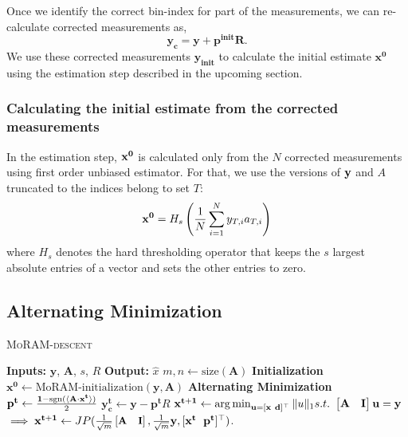 Once we identify the correct bin-index for part of the measurements, we can re-calculate corrected measurements as,
$$
\mathbf{y_{c} = y + p^{init}R}.
$$
We use these corrected measurements $\mathbf{y_{init}}$ to calculate the initial estimate $\mathbf{{x}^0}$ using the estimation step described in the upcoming section.
\subsubsection{Calculating the initial estimate from the corrected measurements}
In the estimation step, $\mathbf{x^0}$ is calculated only from the $N$ corrected measurements using first order unbiased estimator. For that, we use the versions of $\mathbf{y}$ and $A$ truncated to the indices belong to set $T$:
\begin{equation}
\mathbf{x^0} = H_s\left( \frac{1}{N}\sum_{i=1}^{N}y_{T,i}a_{T,i}\right)
\label{eq:init}
\end{equation}
where $H_s$ denotes the hard thresholding operator that keeps the $s$ largest absolute entries of a vector and sets the other entries to zero.
\subsection{Alternating Minimization}
\label{sec:altmin}
\begin{algorithm}[H]
	\caption{\textsc{MoRAM-descent}}
	\label{alg:MoRAM}
	\begin{algorithmic}
		\State\textbf{Inputs:} $\mathbf{y}$, $\mathbf{A}$, $s$, $R$
		\State\textbf{Output:}  $\widehat{x}$
		\State $m,n \leftarrow \mathrm{size}(\mathbf{A})$ 
		\State \textbf{Initialization}
		\State $\mathbf{x^0} \leftarrow \textrm{MoRAM-initialization}(\mathbf{y, A})$ 
		\State \textbf{Alternating Minimization}
		\State $\mathbf{{p}^{t}} \leftarrow \frac{\mathbf{1}-\mathrm{sgn}(\langle \mathbf{A} \cdot \mathbf{x^t} \rangle)}{2}$
		\State $\mathbf{y^t_c} \leftarrow \mathbf{y} - \mathbf{p^t}R$
		\State $\mathbf{{x}^{t+1}}\leftarrow \operatorname*{arg\,min}_{\mathbf{u}=[\mathbf{x~d}]^\top}\|u\|_1  s.t.~ \begin{bmatrix} \mathbf{A} & \mathbf{I} \end{bmatrix}\mathbf{u} = \mathbf{y}$ 
		\State $\implies \mathbf{{x}^{t+1}}\leftarrow \small{JP(\frac{1}{\sqrt{m}}\begin{bmatrix} \mathbf{A} & \mathbf{I} \end{bmatrix},\frac{1}{\sqrt{m}}\mathbf{y},[\mathbf{x^t~~p^t}]^\top)}$.
		\EndFor
	\end{algorithmic}
\end{algorithm}


